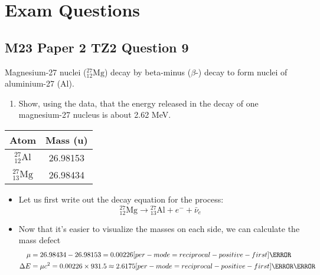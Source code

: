 \documentclass[a4paper,12pt]{article}
\let\oldsection\section
\renewcommand\section{\clearpage\oldsection}
\let\oldsi\si
\renewcommand{\si}[1]{\oldsi[per-mode=reciprocal-positive-first]{#1}}
\newcommand{\atom}[3]{{}^{#1}_{#2}\text{#3}}
\begin{document}
\section{Exam Questions}

\subsection{M23 Paper 2 TZ2 Question 9}

Magnesium-27 nuclei ($\atom{27}{12}{Mg}$) decay by beta-minus ($\beta$-) decay to form nuclei of aluminium-27 (Al).

\begin{enumerate}[label=(\alph*)]
  \item Show, using the data, that the energy released in the decay of one magnesium-27 nucleus is about 2.62 MeV.
\end{enumerate}
\begin{table}[H]
  \centering
  \begin{tabular}{|c|c|}\hline
    Atom                & Mass (u) \\ \hline
    $\atom{27}{12}{Al}$ & 26.98153 \\ \hline
    $\atom{27}{13}{Mg}$ & 26.98434 \\ \hline
  \end{tabular}
\end{table}

\begin{itemize}
  \item Let us first write out the decay equation for the process:
        $$\atom{27}{12}{Mg} \rightarrow \atom{27}{13}{Al} + e^- + \bar{\nu}_e$$
  \item Now that it's easier to visualize the masses on each side, we can calculate the mass defect
        \begin{align*}
          \mu      & = 26.98434 - 26.98153  = 0.00226 \si{\atomicmassunit}                           \\
          \Delta E & = \mu c^2         = 0.00226 \times 931.5 \approx 2.6175 \si{\mega\electronvolt}
        \end{align*}
\end{itemize}
\end{document}
